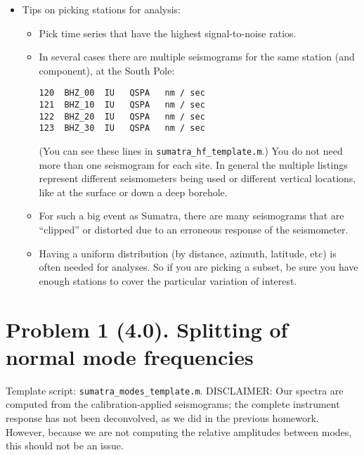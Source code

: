 \documentclass[11pt,titlepage,fleqn]{article}
\begin{document}
\begin{itemize}
\item Tips on picking stations for analysis:
\begin{itemize}
\item Pick time series that have the highest signal-to-noise ratios.
\item In several cases there are multiple seismograms for the same station (and component), \eg at the South Pole:
%
\begin{spacing}{1.0}
\begin{verbatim}
120  BHZ_00  IU   QSPA   nm / sec
121  BHZ_10  IU   QSPA   nm / sec
122  BHZ_20  IU   QSPA   nm / sec
123  BHZ_30  IU   QSPA   nm / sec
\end{verbatim}
\end{spacing}
%
(You can see these lines in \verb+sumatra_hf_template.m+.)
You do not need more than one seismogram for each site. In general the multiple listings represent different seismometers being used or different vertical locations, like at the surface or down a deep borehole.

\item For such a big event as Sumatra, there are many seismograms that are ``clipped'' or distorted due to an erroneous response of the seismometer.

\item Having a uniform distribution (by distance, azimuth, latitude, etc) is often needed for analyses. So if you are picking a subset, be sure you have enough stations to cover the particular variation of interest.
\end{itemize}

\end{itemize}


\section*{Problem 1 (4.0). Splitting of normal mode frequencies}

Template script: \verb+sumatra_modes_template.m+. DISCLAIMER: Our spectra are computed from the calibration-applied seismograms; the complete instrument response has not been deconvolved, as we did in the previous homework. However, because we are not computing the relative amplitudes between modes, this should not be an issue.
\end{document}
